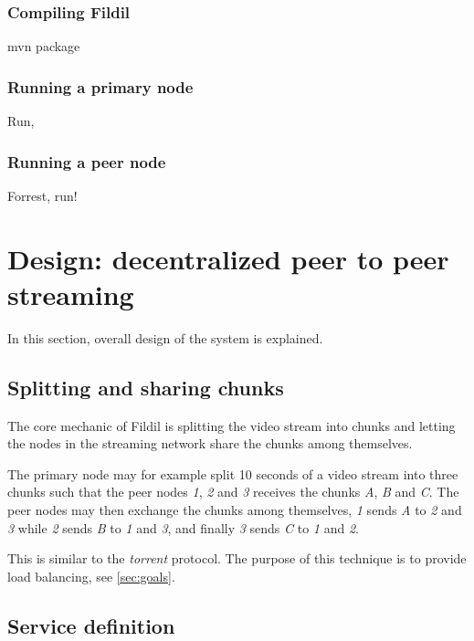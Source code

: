 \documentclass[10pt, a4paper]{article}
\begin{document}
\subsubsection{Compiling Fildil}

mvn package

\subsubsection{Running a primary node}

Run,

\subsubsection{Running a peer node}

Forrest, run!


\section{Design: decentralized peer to peer streaming}
\label{sec:design}

In this section, overall design of the system is explained.

\subsection{Splitting and sharing chunks}

The core mechanic of Fildil is splitting the video stream into chunks
and letting the nodes in the streaming network share the chunks among
themselves. 

The primary node may for example split 10 seconds of a video stream
into three chunks such that the peer nodes \emph{1}, \emph{2} and
\emph{3} receives the chunks \emph{A}, \emph{B} and \emph{C}. The peer
nodes may then exchange the chunks among themselves, \emph{1}
sends \emph{A} to \emph{2} and \emph{3} while \emph{2} sends \emph{B}
to \emph{1} and \emph{3}, and finally \emph{3} sends \emph{C} to
\emph{1} and \emph{2}.

This is similar to the \emph{torrent} protocol. The purpose of this
technique is to provide load balancing, see \autoref{sec:goals}.


\subsection{Service definition}
\label{sec:protobuf}
\end{document}
